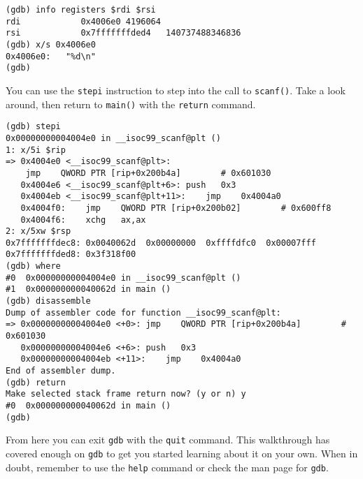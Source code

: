 \begin{lstlisting}
(gdb) info registers $rdi $rsi
rdi            0x4006e0	4196064
rsi            0x7fffffffded4	140737488346836
(gdb) x/s 0x4006e0
0x4006e0:	"%d\n"
(gdb) 
\end{lstlisting}

You can use the \texttt{stepi} instruction to step into the call to
\texttt{scanf()}. Take a look around, then return to \texttt{main()} with the
\texttt{return} command.

\begin{lstlisting}
(gdb) stepi 
0x00000000004004e0 in __isoc99_scanf@plt ()
1: x/5i $rip
=> 0x4004e0 <__isoc99_scanf@plt>:	
    jmp    QWORD PTR [rip+0x200b4a]        # 0x601030
   0x4004e6 <__isoc99_scanf@plt+6>:	push   0x3
   0x4004eb <__isoc99_scanf@plt+11>:	jmp    0x4004a0
   0x4004f0:	jmp    QWORD PTR [rip+0x200b02]        # 0x600ff8
   0x4004f6:	xchg   ax,ax
2: x/5xw $rsp
0x7fffffffdec8:	0x0040062d	0x00000000	0xffffdfc0	0x00007fff
0x7fffffffded8:	0x3f318f00
(gdb) where
#0  0x00000000004004e0 in __isoc99_scanf@plt ()
#1  0x000000000040062d in main ()
(gdb) disassemble 
Dump of assembler code for function __isoc99_scanf@plt:
=> 0x00000000004004e0 <+0>:	jmp    QWORD PTR [rip+0x200b4a]        # 0x601030
   0x00000000004004e6 <+6>:	push   0x3
   0x00000000004004eb <+11>:	jmp    0x4004a0
End of assembler dump.
(gdb) return
Make selected stack frame return now? (y or n) y
#0  0x000000000040062d in main ()
(gdb) 
\end{lstlisting}

From here you can exit \texttt{gdb} with the \texttt{quit} command. This
walkthrough has covered enough on \texttt{gdb} to get you started learning about
it on your own. When in doubt, remember to use the \texttt{help} command or
check the man page for \texttt{gdb}.
